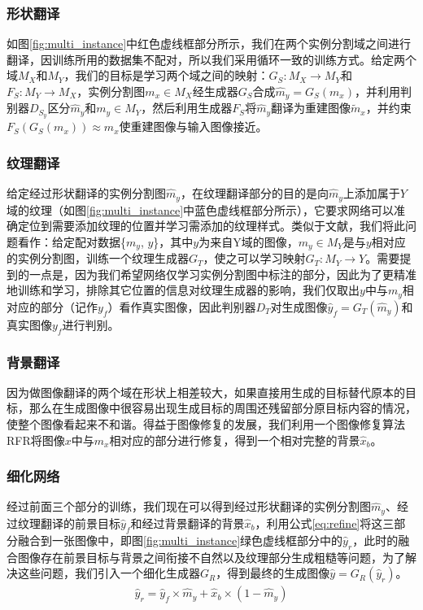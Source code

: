 \subsubsection{形状翻译}

如图\ref{fig:multi_instance}中红色虚线框部分所示，我们在两个实例分割域之间进行翻译，因训练所用的数据集不配对，所以我们采用循环一致\cite{zhu2017unpaired}的训练方式。给定两个域$M_X$和$M_Y$，我们的目标是学习两个域之间的映射：$G_S: M_X\to M_Y$和$F_S: M_Y\to M_X$，实例分割图$m_x\in M_X$经生成器$G_S$合成$\hat{m}_y=G_S(m_x)$，并利用判别器$D_{S_y}$区分$\hat{m}_y$和$m_y\in M_Y$，然后利用生成器$F_S$将$\hat{m}_y$翻译为重建图像$\tilde{m}_x$，并约束$F_S(G_S(m_x))\approx m_x$使重建图像与输入图像接近。

\subsubsection{纹理翻译}

给定经过形状翻译的实例分割图$\hat{m}_y$，在纹理翻译部分的目的是向$\hat{m}_y$上添加属于$Y$域的纹理（如图\ref{fig:multi_instance}中蓝色虚线框部分所示），它要求网络可以准确定位到需要添加纹理的位置并学习需添加的纹理样式。类似于文献\cite{yang2019controllable}，我们将此问题看作：给定配对数据\{$m_y$, $y$\}，其中$y$为来自Y域的图像，$m_y\in M_Y$是与$y$相对应的实例分割图，训练一个纹理生成器$G_T$，使之可以学习映射$G_T: M_Y\to Y$。需要提到的一点是，因为我们希望网络仅学习实例分割图中标注的部分，因此为了更精准地训练和学习，排除其它位置的信息对纹理生成器的影响，我们仅取出$y$中与$m_y$相对应的部分（记作$y_f$）看作真实图像，因此判别器$D_T$对生成图像$\hat{y}_f=G_T(\hat{m}_y)$和真实图像$y_f$进行判别。

\subsubsection{背景翻译}

因为做图像翻译的两个域在形状上相差较大，如果直接用生成的目标替代原本的目标，那么在生成图像中很容易出现生成目标的周围还残留部分原目标内容的情况，使整个图像看起来不和谐。得益于图像修复的发展，我们利用一个图像修复算法RFR\cite{li2020recurrent}将图像$x$中与$m_x$相对应的部分进行修复，得到一个相对完整的背景$\hat{x}_b$。

\subsubsection{细化网络}

经过前面三个部分的训练，我们现在可以得到经过形状翻译的实例分割图$\hat{m}_y$、经过纹理翻译的前景目标$\hat{y}_f$和经过背景翻译的背景$\hat{x}_b$，利用公式\ref{eq:refine}将这三部分融合到一张图像中，即图\ref{fig:multi_instance}绿色虚线框部分中的$\hat{y}_r$，此时的融合图像存在前景目标与背景之间衔接不自然以及纹理部分生成粗糙等问题，为了解决这些问题，我们引入一个细化生成器$G_R$，得到最终的生成图像$\hat{y}=G_R(\hat{y}_r)$。
\begin{equation}
\begin{split}
\hat{y}_r=\hat{y}_f\times\hat{m}_y+\hat{x}_b\times(1-\hat{m}_y)
\end{split}
\label{eq:refine}
\end{equation}


